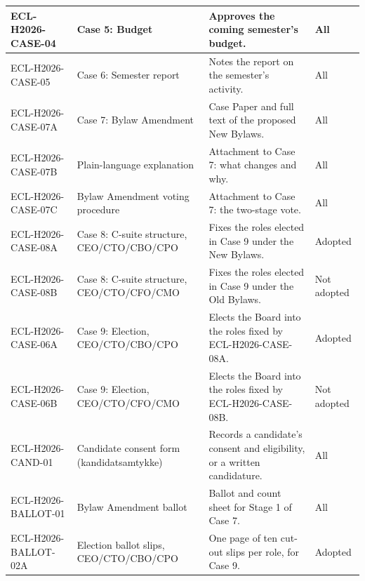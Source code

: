\documentclass{../../../Common/Latex/Templates/rapport}
\begin{document}
\begin{longtable}{|L{3.2cm}|L{3.6cm}|L{5.3cm}|L{1.9cm}|}
  ECL-H2026-CASE-04   & Case 5: Budget                                  & Approves the coming semester's budget.                                                        & All \\
  \hline
  ECL-H2026-CASE-05   & Case 6: Semester report                         & Notes the report on the semester's activity.                                                  & All \\
  \hline
  ECL-H2026-CASE-07A  & Case 7: Bylaw Amendment                         & Case Paper and full text of the proposed New Bylaws.                                          & All \\
  \hline
  ECL-H2026-CASE-07B  & Plain-language explanation                      & Attachment to Case 7: what changes and why.                                                   & All \\
  \hline
  ECL-H2026-CASE-07C  & Bylaw Amendment voting procedure                & Attachment to Case 7: the two-stage vote.                                                     & All \\
  \hline
  ECL-H2026-CASE-08A  & Case 8: C-suite structure, CEO/CTO/CBO/CPO      & Fixes the roles elected in Case 9 under the New Bylaws.                                      & Adopted \\
  \hline
  ECL-H2026-CASE-08B  & Case 8: C-suite structure, CEO/CTO/CFO/CMO      & Fixes the roles elected in Case 9 under the Old Bylaws.                                      & Not adopted \\
  \hline
  ECL-H2026-CASE-06A  & Case 9: Election, CEO/CTO/CBO/CPO               & Elects the Board into the roles fixed by ECL-H2026-CASE-08A.                                 & Adopted \\
  \hline
  ECL-H2026-CASE-06B  & Case 9: Election, CEO/CTO/CFO/CMO               & Elects the Board into the roles fixed by ECL-H2026-CASE-08B.                                 & Not adopted \\
  \hline
  ECL-H2026-CAND-01   & Candidate consent form (kandidatsamtykke)       & Records a candidate's consent and eligibility, or a written candidature.                      & All \\
  \hline
  ECL-H2026-BALLOT-01 & Bylaw Amendment ballot                          & Ballot and count sheet for Stage 1 of Case 7.                                                 & All \\
  \hline
  ECL-H2026-BALLOT-02A & Election ballot slips, CEO/CTO/CBO/CPO         & One page of ten cut-out slips per role, for Case 9.                                           & Adopted \\

\end{longtable}
\end{document}
